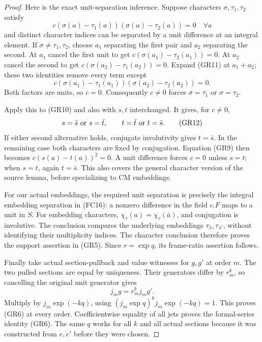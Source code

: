 \begin{proof}
Here is the exact unit-separation inference.
Suppose characters \(\sigma,\tau_1,\tau_2\) satisfy
\[
        c(\sigma(a)-\tau_1(a))(\sigma(a)-\tau_2(a))=0
                                                    \quad\forall a
                                                               \tag{GR11}
\]
and distinct character indices can be separated by a
unit difference at an integral element.
If \(\sigma\ne\tau_1,\tau_2\), choose \(a_1\) separating
the first pair and \(a_2\) separating the second.
At \(a_1\) cancel the first unit to get
\(c(\sigma(a_1)-\tau_2(a_1))=0\).
At \(a_2\) cancel the second to get
\(c(\sigma(a_2)-\tau_1(a_2))=0\).
Expand (GR11) at \(a_1+a_2\); these two identities
remove every term except
\[
             c(\sigma(a_1)-\tau_1(a_1))
                       (\sigma(a_2)-\tau_2(a_2))=0.
\]
Both factors are units, so \(c=0\).
Consequently \(c\ne0\) forces
\(\sigma=\tau_1\) or \(\sigma=\tau_2\).

Apply this to (GR10) and also with \(s,t\) interchanged.
It gives, for \(c\ne0\),
\[
 s=\bar s\ \hbox{or}\ s=\bar t,\qquad
 t=\bar t\ \hbox{or}\ t=\bar s.                             \tag{GR12}
\]
If either second alternative holds, conjugate
involutivity gives \(t=\bar s\).
In the remaining case both characters are fixed by
conjugation.  Equation (GR9) then becomes
\(c(s(a)-t(a))^2=0\).
A unit difference forces \(c=0\) unless \(s=t\);
when \(s=t\), again \(t=\bar s\).
This also covers the general character version of the
source lemma, before specializing to CM embeddings.

For our actual embeddings, the required unit separation
is precisely the integral embedding separation in
(FC16): a nonzero difference in the field \(c.F\)
maps to a unit in \(S\).
For embedding characters,
\(\chi_{\bar\tau}(a)=\chi_\tau(\bar a)\),
and conjugation is involutive.
The conclusion compares the underlying embeddings
\(\tau_\lambda,\tau_{\lambda'}\), without identifying
their multiplicity indices.
The character conclusion therefore proves the
support assertion in (GR5).
Since \(r=\exp q\), its frame-ratio assertion follows.

Finally take actual section-pullback and value
witnesses for \(g,g'\) at order \(m\).
The two pulled sections are equal by uniqueness.
Their generators differ by \(r_m^k\), so cancelling
the original unit generator gives
\[
                           j_mg=r_m^k j_mg'.
\]
Multiply by \(j_m\exp(-kq)\), using
\((j_m\exp q)^k j_m\exp(-kq)=1\).
This proves (GR6) at every order.
Coefficientwise equality of all jets proves the
formal-series identity (GR6).
The same \(q\) works for all \(k\) and all actual
sections because it was constructed from \(e,e'\)
before they were chosen.
\end{proof}

